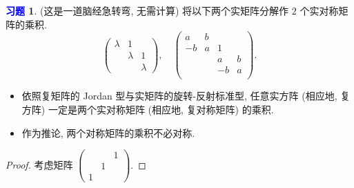 \documentclass[11pt]{ctexart}
\theoremstyle{definition}
\numberwithin{equation}{section}
\theoremstyle{definition}
\newtheorem{exercise}{\textcolor{blue}{习题}}
\theoremstyle{remark}
\begin{document}
\begin{exercise}
    (这是一道脑经急转弯, 无需计算) 将以下两个实矩阵分解作 $2$ 个实对称矩阵的乘积. 
\begin{equation}
    \begin{pmatrix}
        \lambda&1\\&\lambda &1\\&&\lambda
        \end{pmatrix},\quad \begin{pmatrix}
        a&b\\-b&a&1\\&&a&b\\&&-b&a\\
        \end{pmatrix}. 
\end{equation}
\begin{itemize}
    \item 依照复矩阵的 Jordan 型与实矩阵的旋转-反射标准型, 任意实方阵 (相应地, 复方阵) 一定是两个实对称矩阵 (相应地, 复对称矩阵) 的乘积. 
    \item 作为推论, 两个对称矩阵的乘积不必对称. 
\end{itemize}
\begin{proof}
    考虑矩阵 $\begin{pmatrix}
        &&1\\&1&\\1&&
        \end{pmatrix}$. 
\end{proof}
\end{exercise}
\end{document}
